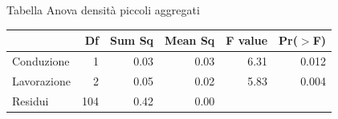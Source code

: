 \begin{frame}
  \begin{figure}
  \end{figure}
\end{frame}

\begin{frame}{Tabella Anova  densit\`a piccoli aggregati}
  \begin{table}
    \centering
    \begin{tabular}{lrrrrr}
      \hline
      & Df & Sum Sq & Mean Sq & F value & Pr($>$F) \\ 
      \hline
      Conduzione & 1 & 0.03 & 0.03 & 6.31 & 0.012 \\ 
      Lavorazione & 2 & 0.05 & 0.02 & 5.83 & 0.004 \\ 
      Residui & 104 & 0.42 & 0.00 &  &  \\ 
      \hline
    \end{tabular}
    \label{tab:Anova densita per spinta}
  \end{table}
\end{frame}


